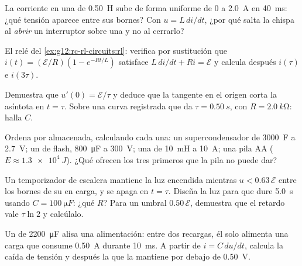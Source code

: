 \begin{exercise}[$\star\star$]\label{exo:g12:rc-rl-circuits:9}
La corriente en una  de \qty{0.50}{H} sube de forma uniforme de $0$ a
\qty{2.0}{A} en \qty{40}{ms}: ¿qué tensión aparece entre sus bornes? Con
$u = L\,di/dt$, ¿por qué salta la chispa al \emph{abrir} un interruptor sobre una
 y no al cerrarlo?
\end{exercise}

\begin{exercise}[$\star\star$]\label{exo:g12:rc-rl-circuits:10}
El relé del \cref{ex:g12:rc-rl-circuits:rl}: verifica por sustitución que
$i(t) = (\mathcal{E}/R)(1 - e^{-Rt/L})$ satisface $L\,di/dt + Ri = \mathcal{E}$ y
calcula después $i(\tau)$ e $i(3\tau)$.
\end{exercise}

\begin{exercise}[$\star\star$]\label{exo:g12:rc-rl-circuits:11}
Demuestra que $u'(0) = \mathcal{E}/\tau$ y deduce que la tangente en el origen corta
la asíntota en $t = \tau$. Sobre una curva registrada que da $\tau = \qty{0.50}{s}$,
con $R = \qty{2.0}{k\ohm}$: halla $C$.
\end{exercise}

\begin{exercise}[$\star\star\star$]\label{exo:g12:rc-rl-circuits:12}
Ordena por  almacenada, calculando cada una: un supercondensador de
\qty{3000}{F} a \qty{2.7}{V}; un  de flash, \qty{800}{\micro F} a
\qty{300}{V}; una  de \qty{10}{mH} a \qty{10}{A}; una pila AA
($E \approx \qty{1.3e4}{J}$). ¿Qué ofrecen los tres primeros que la pila no puede dar?
\end{exercise}

\begin{exercise}[$\star\star\star$]\label{exo:g12:rc-rl-circuits:13}
Un temporizador de escalera mantiene la luz encendida mientras
$u < 0.63\,\mathcal{E}$ entre los bornes de su  en carga, y se apaga en
$t = \tau$. Diseña la luz para que dure \qty{5.0}{s} usando $C = \qty{100}{\micro F}$:
¿qué $R$? Para un umbral $0.50\,\mathcal{E}$, demuestra que el retardo vale
$\tau \ln 2$ y calcúlalo.
\end{exercise}

\begin{exercise}[$\star\star\star$]\label{exo:g12:rc-rl-circuits:14}
Un  de \qty{2200}{\micro F} alisa una alimentación: entre dos recargas, él
solo alimenta una carga que consume \qty{0.50}{A} durante \qty{10}{ms}. A partir de
$i = C\,du/dt$, calcula la caída de tensión y después la  que la mantiene por
debajo de \qty{0.50}{V}.
\end{exercise}

